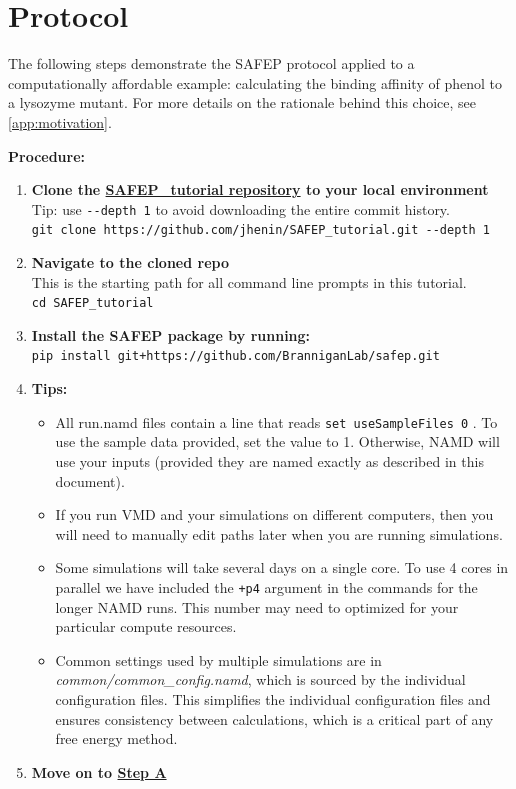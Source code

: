 \documentclass[9pt,tutorial]{Styling/livecoms}
\newcommand{\filepath}[1]{\textit{#1}}
\newcommand{\textInput}[1]{
  \texttt{#1}
}
\begin{document}
\section{Protocol} \label{sec:protocol}
\vspace{0.5em}

The following steps demonstrate the SAFEP protocol applied to a computationally affordable example: calculating the binding affinity of phenol to a lysozyme mutant.
For more details on the rationale behind this choice, see \ref{app:motivation}.

\textbf{Procedure:}
\begin{enumerate}
    \item \textbf{Clone the \href{https://github.com/jhenin/SAFEP_tutorial}{SAFEP\_tutorial repository} to your local environment} Tip: use \textInput{-{}-depth 1} to avoid downloading the entire commit history. \\
    \textInput{git clone https://github.com/jhenin/SAFEP\_tutorial.git -{}-depth 1}
    \item \textbf{Navigate to the cloned repo}\\
    This is the starting path for all command line prompts in this tutorial. \\
    \textInput{cd SAFEP\_tutorial}
    \item \textbf{Install the SAFEP package by running:}\\
    \textInput{pip install git+https://github.com/BranniganLab/safep.git}
    \item \textbf{Tips:} 
    \begin{itemize}
    \item All run.namd files contain a line that reads \textInput{set useSampleFiles 0}. To use the sample data provided, set the value to 1. Otherwise, NAMD will use your inputs (provided they are named exactly as described in this document).
    \item If you run VMD and your simulations on different computers, then you will need to manually edit paths later when you are running simulations. 
    \item Some simulations will take several days on a single core. To use 4 cores in parallel we have included the \textInput{+p4} argument in the commands for the longer NAMD runs. This number may need to optimized for your particular compute resources.
    \item Common settings used by multiple simulations are in \filepath{common/common\_config.namd}, which is sourced by the individual configuration files. This simplifies the individual configuration files and ensures consistency between calculations, which is a critical part of any free energy method.
    \end{itemize}
    \item \textbf{Move on to \hyperref[step:equilibrium]{Step A}}
\end{enumerate}
\end{document}
